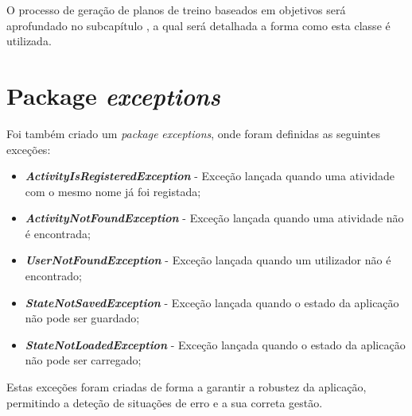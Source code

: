 \documentclass[a4paper,12pt]{scrreprt}
\begin{document}
    O processo de geração de planos de treino baseados em objetivos será aprofundado no subcapítulo \textit{},
    a qual será detalhada a forma como esta classe é utilizada.

\section{Package \textit{exceptions}}
    \label{sec:exceptions}
    Foi também criado um \textit{package} \textit{exceptions}, onde foram definidas as seguintes exceções:

    \begin{itemize}
        \item \textit{\textbf{ActivityIsRegisteredException}} - Exceção lançada quando uma atividade com o mesmo nome já foi registada;
        \item \textit{\textbf{ActivityNotFoundException}} - Exceção lançada quando uma atividade não é encontrada;
        \item \textit{\textbf{UserNotFoundException}} - Exceção lançada quando um utilizador não é encontrado;
        \item \textit{\textbf{StateNotSavedException}} - Exceção lançada quando o estado da aplicação não pode ser guardado;
        \item \textit{\textbf{StateNotLoadedException}} - Exceção lançada quando o estado da aplicação não pode ser carregado;
    \end{itemize}

    Estas exceções foram criadas de forma a garantir a robustez da aplicação,
    permitindo a deteção de situações de erro e a sua correta gestão.


\end{document}
